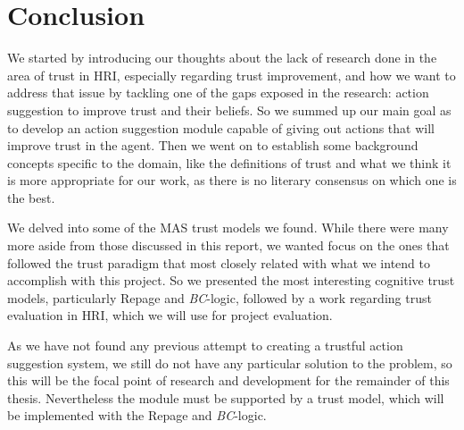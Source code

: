\section{Conclusion}
\label{sec:Conclusion}
We started by introducing our thoughts about the lack of research done in the area of trust in \ac{HRI}, especially regarding trust improvement, and how we want to address that issue by tackling one of the gaps exposed in the research: action suggestion to improve trust and their beliefs. So we summed up our main goal as to develop an action suggestion module capable of giving out actions that will improve trust in the agent. Then we went on to establish some background concepts specific to the domain, like the definitions of trust and what we think it is more appropriate for our work, as there is no literary consensus on which one is the best. 

We delved into some of the \ac{MAS} trust models we found. While there were many more aside from those discussed in this report, we wanted focus on the ones that followed the trust paradigm that most closely related with what we intend to accomplish with this project. So we presented the most interesting cognitive trust models, particularly Repage and \textit{BC}-logic, followed by a work regarding trust evaluation in \ac{HRI}, which we will use for project evaluation.

As we have not found any previous attempt to creating a trustful action suggestion system, we still do not have any particular solution to the problem, so this will be the focal point of research and development for the remainder of this thesis. Nevertheless the module must be supported by a trust model, which will be implemented with the Repage and \textit{BC}-logic.